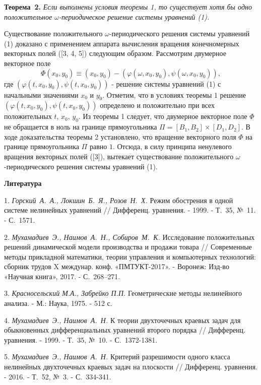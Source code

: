 \textbf{Теорема~2.} {\it Если выполнены условия теоремы 1, то
существует хотя бы одно положительное $\omega$-периодическое
решение системы уравнений (1).}

Существование положительного $\omega$-периодического решения
системы уравнений (1) доказано с применением аппарата вычисления
вращения конечномерных векторных полей ([3, 4, 5]) следующим
образом. Рассмотрим двумерное векторное поле
$$
\Phi(x_0,y_0)\equiv(x_0,y_0)-(\varphi(\omega,x_0,y_0),\psi(\omega,x_0,y_0)),
$$
где $(\varphi(t,x_0,y_0),\psi(t,x_0,y_0))$ - решение системы
уравнений (1) с начальными значениями $x_0$ и $y_0$. Отметим, что
в условиях теоремы 1 решение
$(\varphi(t,x_0,y_0),\psi(t,x_0,y_0))$ определено и положительно
при всех положительных $t$, $x_0$, $y_0$. Из теоремы 1 следует,
что двумерное векторное поле $\Phi$ не обращается в ноль на
границе прямоугольника $\Pi=[B_1, B_2]\times[D_1, D_2]$. В ходе
доказательства теоремы 2 установлено, что вращение векторного поля
$\Phi$ на границе прямоугольника $\Pi$ равно $1$. Отсюда, в силу
принципа ненулевого вращения векторных полей ([3]), вытекает
существование положительного $\omega$-периодического решения
системы уравнений (1).


\smallskip \centerline{\bf Литература}\nopagebreak

1. {\it  Горский~А.~А., Локшин~Б.~Я., Розов~Н.~Х. } Режим
обострения в одной системе нелинейных уравнений // Дифференц.
уравнения. - 1999. - Т.~35, №~11. - С.~1571.


2. {\it Мухамадиев~Э., Наимов~А.~Н., Собиров~М.~К. } Исследование
положительных решений динамической модели производства и продажи
товара // Современные методы прикладной математики, теории
управления и компьютерных технологий: сборник трудов X междунар.
конф. «ПМТУКТ-2017».  - Воронеж: Изд-во  «Научная книга», 2017. -
С.~268–271.


3. {\it Красносельский М.А., Забрейко П.П. } Геометрические методы
нелинейного анализа. - М.: Наука, 1975. - 512 с.


4. {\it Мухамадиев~Э., Наимов~А.~Н.} К теории двухточечных краевых
задач для обыкновенных дифференциальных уравнений второго порядка
// Дифференц. уравнения. - 1999. - Т.~35, №~10. - С.~1372-1381.


5. {\it Мухамадиев~Э., Наимов~А.~Н.} Критерий разрешимости одного
класса нелинейных двухточечных краевых задач на плоскости
// Дифференц. уравнения. - 2016. - Т.~52, №~3. - С.~334-341.


